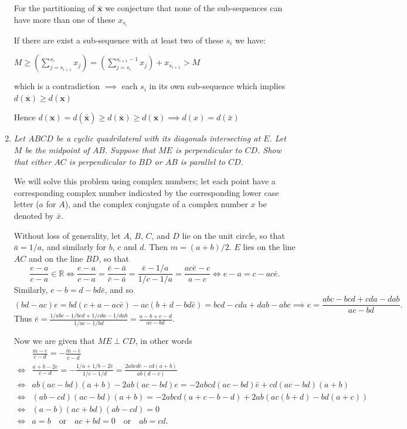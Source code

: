 \documentclass{article}
\begin{document}
\begin{enumerate}
For the partitioning of $\bar{\mathbf{x}}$ we conjecture that none of the sub-sequences can have more than one of these $x_{s_i}$

If there are exist a sub-sequence with at least two of these $s_i$ we have:
\begin{center}
    $M \geq (\sum_{j=s_{i+1}}^{s_i} x_j) = (\sum_{j=s_i}^{s_{i+1}-1} x_j) + x_{s_{i+1}} > M$ 
\end{center}
which is a contradiction $\implies$ each $s_i$ in its own sub-sequence which implies $d(\overline{\mathbf{x}}) \geq d(\mathbf{x})$

Hence $d(\mathbf{x}) = d(\overline{\overline{\mathbf{x}}}) \geq d(\overline{\mathbf{x}}) \geq d(\mathbf{x})\implies d(x) = d(\bar x)$



\medskip
\item
{\itshape Let $ABCD$ be a cyclic quadrilateral with its diagonals intersecting at $E$.
Let $M$ be the midpoint of $AB$.
Suppose that $ME$ is perpendicular to $CD$.
Show that either $AC$ is perpendicular to $BD$ or $AB$ is parallel to $CD$.}

We will solve this problem using complex numbers; let each point have a corresponding complex number indicated by the corresponding lower case letter ($a$ for $A$), and the complex conjugate of a complex number $x$ be denoted by $\bar{x}$.

Without loss of generality, let $A$, $B$, $C$, and $D$ lie on the unit circle, so that $\bar{a} = 1/a$, and similarly for $b$, $c$ and $d$.
Then $m = (a+b)/2$.
$E$ lies on the line $AC$ and on the line $BD$, so that
\[ \frac{e-a}{c-a} \in \mathbb{R} \iff \frac{e-a}{c-a} = \frac{\bar{e}-\bar{a}}{\bar{c}-\bar{a}} = \frac{\bar{e}-1/a}{1/c-1/a} = \frac{ac\bar{e}-c}{a-c} \iff e-a = c-ac\bar{e}. \]
Similarly, $e-b = d-bd\bar{e}$, and so
\[ (bd-ac)e = bd(c+a-ac\bar{e}) -ac(b+d-bd\bar{e}) = bcd -cda +dab -abc \implies e = \frac{abc-bcd+cda-dab}{ac-bd}. \]
Thus $\bar{e} = \frac{1/abc -1/bcd +1/cda -1/dab}{1/ac -1/bd} = \frac{a-b+c-d}{ac-bd}$.

Now we are given that $ME \perp CD$, in other words
\begin{align*}
	     & \frac{m-e}{c-d} = -\frac{\bar{m}-\bar{e}}{\bar{c}-\bar{d}} \\
	\iff & \frac{a+b-2e}{c-d} = -\frac{1/a+1/b-2\bar{e}}{1/c-1/d} = \frac{2abcd\bar{e}-cd(a+b)}{ab(d-c)} \\
	\iff & ab(ac-bd)(a+b)-2ab(ac-bd)e = -2abcd(ac-bd)\bar{e} +cd(ac-bd)(a+b) \\
	\iff & (ab-cd)(ac-bd)(a+b) = -2abcd(a+c-b-d) +2ab(ac(b+d)-bd(a+c)) \\
	\iff & (a-b)(ac+bd)(ab-cd) = 0 \\
	\iff & a = b \quad \text{or} \quad ac+bd = 0 \quad \text{or} \quad ab = cd.
\end{align*}


\end{enumerate}
\end{document}
